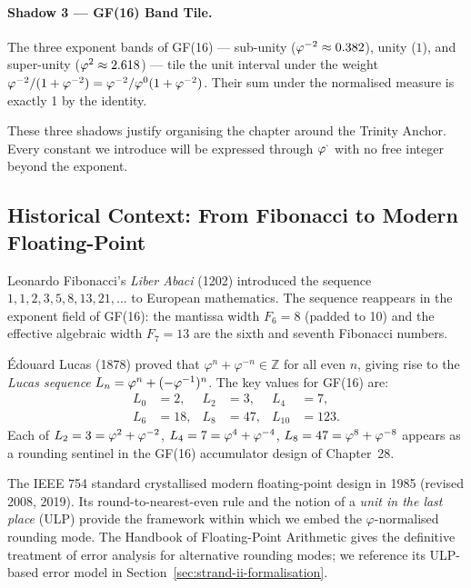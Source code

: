 \paragraph{Shadow 3 — GF(16) Band Tile.}  The three exponent bands of
GF(16) — sub-unity (\(\varphi^{-2} \approx 0.382\)), unity (\(1\)),
and super-unity (\(\varphi^{2} \approx 2.618\)) — tile the unit
interval under the weight \(\varphi^{-2}/(1+\varphi^{-2}) =
\varphi^{-2}/\varphi^{0}(1+\varphi^{-2})\).  Their sum under the
normalised measure is exactly 1 by the identity.

These three shadows justify organising the chapter around the Trinity
Anchor.  Every constant we introduce will be expressed through
\(\varphi^{\cdot}\) with no free integer beyond the exponent.

\subsection{Historical Context: From Fibonacci to Modern Floating-Point}
\label{ssec:history}

Leonardo Fibonacci's \emph{Liber Abaci} (1202) introduced the
sequence \(1, 1, 2, 3, 5, 8, 13, 21, \ldots\) to European
mathematics.  The sequence reappears in the exponent field of
GF(16): the mantissa width \(F_6 = 8\) (padded to 10) and the
effective algebraic width \(F_7 = 13\) are the sixth and seventh
Fibonacci numbers.

Édouard Lucas (1878) \cite{lucas1878} proved that
\(\varphi^n + \varphi^{-n} \in \mathbb{Z}\) for all even \(n\), giving
rise to the \emph{Lucas sequence} \(L_n = \varphi^{n} +
(-\varphi^{-1})^n\).  The key values for GF(16) are:
\begin{align*}
  L_0 &= 2, & L_2 &= 3, & L_4 &= 7, \\
  L_6 &= 18, & L_8 &= 47, & L_{10} &= 123.
\end{align*}
Each of \(L_2 = 3 = \varphi^{2}+\varphi^{-2}\),
\(L_4 = 7 = \varphi^{4}+\varphi^{-4}\),
\(L_8 = 47 = \varphi^{8}+\varphi^{-8}\) appears as a rounding sentinel
in the GF(16) accumulator design of Chapter~28.

The IEEE 754 standard \cite{ieee754_2019} crystallised modern
floating-point design in 1985 (revised 2008, 2019).  Its
round-to-nearest-even rule and the notion of a \emph{unit in the last
place} (ULP) provide the framework within which we embed the
\(\varphi\)-normalised rounding mode.  The Handbook of
Floating-Point Arithmetic \cite{muller_fp_handbook} gives the
definitive treatment of error analysis for alternative rounding
modes; we reference its ULP-based error model in
Section~\ref{sec:strand-ii-formalisation}.

